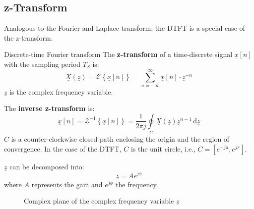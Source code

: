 \begin{refsection}
\subsection{z-Transform}

Analogous to the Fourier and Laplace transform, the \acf{DTFT} is a special case of the z-transform.

\begin{definition}{Discrete-time Fourier transform}
	The  \textbf{z-transform} of a time-discrete signal $\underline{x}[n]$ with the sampling period $T_S$ is:
	\begin{equation}
		\underline{X}\left(\underline{z}\right) = \mathcal{Z}\left\{\underline{x}[n]\right\} = \sum\limits_{n = -\infty}^{\infty} \underline{x}[n] \cdot \underline{z}^{-n}
	\end{equation}
	$\underline{z}$ is the complex frequency variable.
	
	The   \textbf{inverse z-transform} is:
	\begin{equation}
		\underline{x}[n] = \mathcal{Z}^{-1}\left\{\underline{x}[n]\right\} = \frac{1}{2 \pi j} \oint\limits_{C} \underline{X}\left(\underline{z}\right) \underline{z}^{n-1} \, \mathrm{d} \underline{z}
	\end{equation}
	$C$ is a counter-clockwise closed path enclosing the origin and the region of convergence. In the case of the \ac{DTFT}, $C$ is the unit circle, i.e., $C = [e^{-j \pi}, e^{j \pi}]$.
\end{definition}

$\underline{z}$ can be decomposed into:
\begin{equation}
	\underline{z} = A e^{j \phi}
\end{equation}
where $A$ represents the gain and $e^{j \phi}$ the frequency.
\begin{figure}[H]
	\centering
	\caption{Complex plane of the complex frequency variable $\underline{z}$}
	\label{fig:ch04:ztrafo_z_cmplx_plane}
\end{figure}


\end{refsection}
